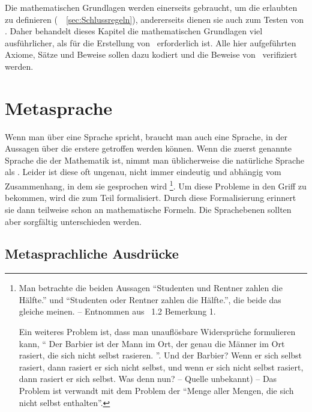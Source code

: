 Die mathematischen Grundlagen werden einerseits gebraucht, um die erlaubten  zu definieren (\seename\ \sectionname~\vref{sec:Schlussregeln}), andererseits dienen sie auch zum Testen von \ASBA. Daher behandelt dieses Kapitel die mathematischen Grundlagen viel ausführlicher, als für die Erstellung von \ASBA\ erforderlich ist. Alle hier aufgeführten Axiome, Sätze und Beweise sollen dazu kodiert und die Beweise von \ASBA\ verifiziert werden.

\section{Metasprache}%
\label{sec:Metasprache}

Wenn man über eine Sprache spricht, braucht man auch eine Sprache, in der Aussagen über die erstere getroffen werden können.
Wenn die zuerst genannte Sprache die der Mathematik ist, nimmt man üblicherweise die natürliche Sprache als .
Leider ist diese oft ungenau, nicht immer eindeutig und abhängig vom Zusammenhang, in dem sie gesprochen wird%
\footnote{%
	Man betrachte die beiden Aussagen \enquote{Studenten und Rentner zahlen die Hälfte.} und \enquote{Studenten oder Rentner zahlen die Hälfte.}, die beide das gleiche meinen.
	-- Entnommen aus \cite{bib:Rautenberg} \sectionname~1.2 Bemerkung 1.

	Ein weiteres Problem ist, dass man unauflösbare Widersprüche formulieren kann, \textzB \enquote{%
		Der Barbier ist der Mann im Ort, der genau die Männer im Ort rasiert, die sich nicht selbst rasieren.%
	}.
	Und der Barbier?
	Wenn er sich selbst rasiert, dann rasiert er sich nicht selbst, und wenn er sich nicht selbst rasiert, dann rasiert er sich selbst.
	Was denn nun?
	-- Quelle unbekannt) --
	Das Problem ist verwandt mit dem Problem der \enquote{Menge aller Mengen, die sich nicht selbst enthalten}.%
}.
Um diese Probleme in den Griff zu bekommen, wird die  zum Teil formalisiert.
Durch diese Formalisierung erinnert sie dann teilweise schon an mathematische Formeln.
Die Sprachebenen sollten aber sorgfältig unterschieden werden.

\subsection{Metasprachliche Ausdrücke}%
\label{sub:Metaausdruck}

